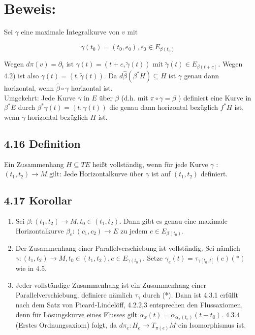 \documentclass[10pt, letterpaper]{article}
\begin{document}
\section*{Beweis:}
Sei $\gamma$ eine maximale Integralkurve von $v$ mit


\begin{equation*}
\gamma\left(t_{0}\right)=\left(t_{0}, e_{0}\right), e_{0} \in E_{\beta\left(t_{0}\right)} \tag{4.2}
\end{equation*}


Wegen $d \pi(v)=\partial_{t}$ ist $\gamma(t)=(t+c, \tilde{\gamma}(t))$ mit $\tilde{\gamma}(t) \in E_{\beta(t+c)}$. Wegen 4.2) ist also $\gamma(t)=(t, \tilde{\gamma}(t))$. Da $d \hat{\beta}\left(\beta^{*} H\right) \subseteq H$ ist $\gamma$ genau dann horizontal, wenn $\hat{\beta} \circ \gamma$ horizontal ist.\\
Umgekehrt: Jede Kurve $\gamma$ in $E$ über $\beta$ (d.h. mit $\pi \circ \gamma=\beta$ ) definiert eine Kurve in $\beta^{*} E$ durch $\beta^{*} \gamma(t)=(t, \gamma(t))$ die genau dann horizontal bezüglich $f^{*} H$ ist, wenn $\gamma$ horizontal bezüglich $H$ ist.

\subsection*{4.16 Definition}
Ein Zusammenhang $H \subseteq T E$ heißt vollständig, wenn für jede Kurve $\gamma$ : $\left(t_{1}, t_{2}\right) \rightarrow M$ gilt: Jede Horizontalkurve über $\gamma$ ist auf $\left(t_{1}, t_{2}\right)$ definiert.

\subsection*{4.17 Korollar}
\begin{enumerate}
  \item Sei $\beta:\left(t_{1}, t_{2}\right) \rightarrow M, t_{0} \in\left(t_{1}, t_{2}\right)$. Dann gibt es genau eine maximale Horizontalkurve $\beta_{e}:\left(c_{1}, c_{2}\right) \rightarrow E$ zu jedem $e \in E_{\beta\left(t_{0}\right)}$.
  \item Der Zusammenhang einer Parallelverschiebung ist vollständig. Sei nämlich $\gamma:\left(t_{1}, t_{2}\right) \rightarrow M, t_{0} \in\left(t_{1}, t_{2}\right), e \in E_{\gamma\left(t_{0}\right)}$. Setze $\gamma_{e}(t)=\tau_{\gamma\left[t_{0}, t\right]}(e)(*)$ wie in 4.5.
  \item Jeder vollständige Zusammenhang ist ein Zusammenhang einer Parallelverschiebung, definiere nämlich $\tau_{\gamma}$ durch (*). Dann ist 4.3.1 erfüllt nach dem Satz von Picard-Lindelöff, 4.2.2,3 entsprechen den Flussaxiomen, denn für Lösungskurve eines Flusses gilt $\alpha_{x}(t)=\alpha_{\alpha_{x}\left(t_{0}\right)}\left(t-t_{0}\right)$. 4.3.4 (Erstes Ordnungsaxiom) folgt, da $d \pi_{e}: H_{e} \rightarrow T_{\pi(e)} M$ ein Isomorphismus ist.
\end{enumerate}
\end{document}
